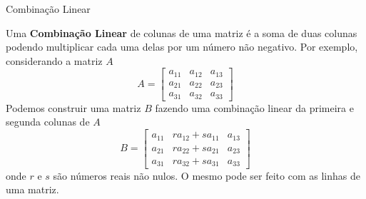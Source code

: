 \begin{teoria}{Combinação Linear}
    
    Uma \textbf{Combinação Linear} de colunas de uma matriz é a soma de duas colunas podendo multiplicar cada uma delas por um número não negativo.
    Por exemplo, considerando a matriz $A$
    \[ A = \left[\begin{array}{ccc}
        a_{11} & a_{12} & a_{13} \\ 
        a_{21} & a_{22} & a_{23} \\ 
        a_{31} & a_{32} & a_{33}
        \end{array}\right]
    \]
    Podemos construir uma matriz $B$ fazendo uma combinação linear da primeira e segunda colunas de $A$
    \[ B = \left[\begin{array}{ccc}
        a_{11} & r a_{12} + s a_{11}& a_{13} \\ 
        a_{21} & r a_{22} + s a_{21}& a_{23} \\ 
        a_{31} & r a_{32} + s a_{31}& a_{33}
    \end{array}\right]
    \]
    onde $r$ e $s$ são números reais não nulos.
    O mesmo pode ser feito com as linhas de uma matriz.
    
\end{teoria}

